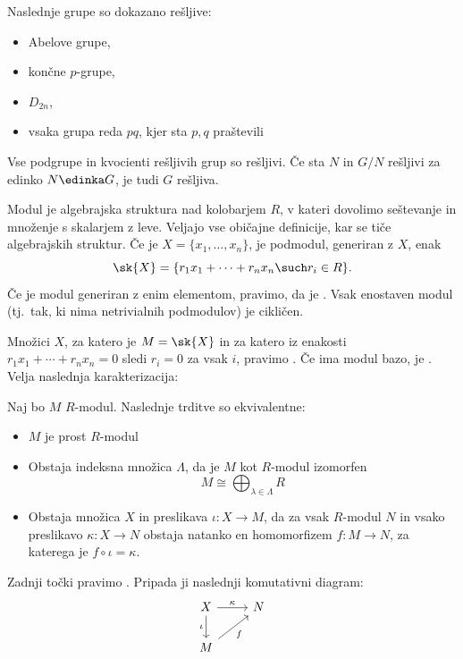 Naslednje grupe so dokazano rešljive:
\begin{itemize}
\item Abelove grupe,
\item končne $p$-grupe,
\item $D_{2n}$,
\item vsaka grupa reda $pq$, kjer sta $p,q$ praštevili
\end{itemize}
Vse podgrupe in kvocienti rešljivih grup so rešljivi.
Če sta $N$ in $G/N$ rešljivi za edinko $N \edinka G$, je tudi $G$ rešljiva.


Modul je algebrajska struktura nad kolobarjem $R$, v kateri dovolimo seštevanje
in množenje s skalarjem z leve.
Veljajo vse običajne definicije, kar se tiče algebrajskih struktur.
Če je $X = \{x_1, \ldots, x_n\}$, je podmodul, generiran z $X$, enak
\[
  \sk{X} = \{r_1 x_1 + \cdots + r_n x_n \such r_i \in R\}.
\]
Če je modul generiran z enim elementom, pravimo, da je .
Vsak enostaven modul (tj.~tak, ki nima netrivialnih podmodulov) je cikličen.

Množici $X$, za katero je $M = \sk{X}$ in za katero iz enakosti $r_1 x_1 +
\cdots + r_n x_n = 0$ sledi $r_i = 0$ za vsak $i$, pravimo .
Če ima modul bazo, je .
Velja naslednja karakterizacija:

\begin{izrek}
  Naj bo $M$ $R$-modul.
  Naslednje trditve so ekvivalentne:
  \begin{itemize}
  \item $M$ je prost $R$-modul
  \item Obstaja indeksna množica $\Lambda$, da je $M$ kot $R$-modul izomorfen
	\[
	  M \cong \bigoplus_{\lambda \in \Lambda} R
	\]
  \item Obstaja množica $X$ in preslikava $\iota: X \to M$, da za vsak $R$-modul
	$N$ in vsako preslikavo $\kappa: X \to N$ obstaja natanko en homomorfizem
	$f: M \to N$, za katerega je $f \circ \iota = \kappa$.
  \end{itemize}
\end{izrek}

Zadnji točki pravimo .
Pripada ji naslednji komutativni diagram:
\[\begin{tikzcd}
	X & N \\
	M
	\arrow["\kappa", from=1-1, to=1-2]
	\arrow["\iota"', from=1-1, to=2-1]
	\arrow["f"', from=2-1, to=1-2]
  \end{tikzcd}\]

